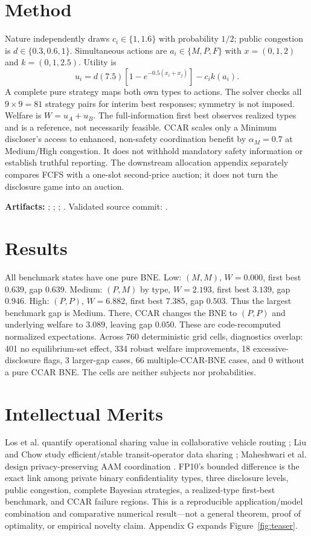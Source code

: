 \section{Method}
Nature independently draws $c_i\in\{1,1.6\}$ with probability $1/2$; public congestion is $d\in\{0.3,0.6,1\}$. Simultaneous actions are $a_i\in\{M,P,F\}$ with $x=(0,1,2)$ and $k=(0,1,2.5)$. Utility is
\[u_i=d(7.5)[1-e^{-0.5(x_i+x_j)}]-c_i k(a_i).\]
A complete pure strategy maps both own types to actions. The solver checks all $9\times9=81$ strategy pairs for interim best responses; symmetry is not imposed. Welfare is $W=u_A+u_B$. The full-information first best observes realized types and is a reference, not necessarily feasible. CCAR scales only a Minimum discloser's access to enhanced, non-safety coordination benefit by $\alpha_M=0.7$ at Medium/High congestion. It does not withhold mandatory safety information or establish truthful reporting. The downstream allocation appendix separately compares FCFS with a one-slot second-price auction; it does not turn the disclosure game into an auction.

\textbf{Artifacts:} \PublicRepo; \ColabOne; \ColabTwo; \SpaceRepo. Validated source commit: \TestedCommit.

\balance
\section{Results}
All benchmark states have one pure BNE. Low: $(M,M)$, $W=0.000$, first best $0.639$, gap $0.639$. Medium: $(P,M)$ by type, $W=2.193$, first best $3.139$, gap $0.946$. High: $(P,P)$, $W=6.882$, first best $7.385$, gap $0.503$. Thus the largest benchmark gap is Medium. There, CCAR changes the BNE to $(P,P)$ and underlying welfare to $3.089$, leaving gap $0.050$. These are code-recomputed normalized expectations. Across 760 deterministic grid cells, diagnostics overlap: 401 no equilibrium-set effect, 334 robust welfare improvements, 18 excessive-disclosure flags, 3 larger-gap cases, 66 multiple-CCAR-BNE cases, and 0 without a pure CCAR BNE. The cells are neither subjects nor probabilities.

\section{Intellectual Merits}
Los et al. quantify operational sharing value in collaborative vehicle routing \cite{los2020value}; Liu and Chow study efficient/stable transit-operator data sharing \cite{liu2022efficient}; Maheshwari et al. design privacy-preserving AAM coordination \cite{maheshwari2025privacy}. FP10's bounded difference is the exact link among private binary confidentiality types, three disclosure levels, public congestion, complete Bayesian strategies, a realized-type first-best benchmark, and CCAR failure regions. This is a reproducible application/model combination and comparative numerical result---not a general theorem, proof of optimality, or empirical novelty claim. Appendix G expands Figure~\ref{fig:teaser}.

